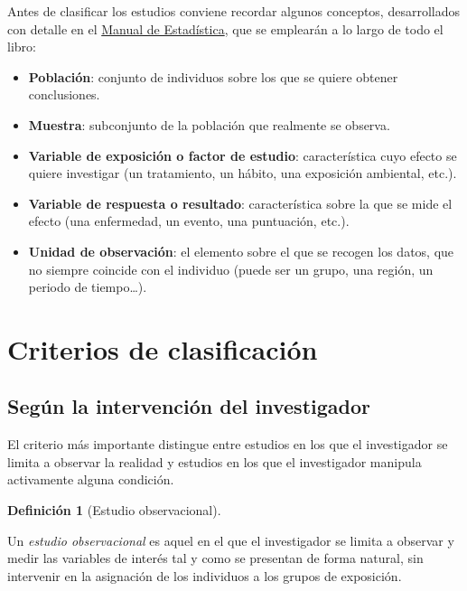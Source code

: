 \documentclass[
  spanish,
  a4paper,
]{scrreport}
\providecommand{\tightlist}{%
  \setlength{\itemsep}{0pt}\setlength{\parskip}{0pt}}
\theoremstyle{definition}
\theoremstyle{definition}
\newtheorem{definition}{Definición}[chapter]
\theoremstyle{remark}
\begin{document}
Antes de clasificar los estudios conviene recordar algunos conceptos,
desarrollados con detalle en el
\href{https://aprendeconalf.es/estadistica-manual/}{Manual de
Estadística}, que se emplearán a lo largo de todo el libro:

\begin{itemize}
\tightlist
\item
  \textbf{Población}: conjunto de individuos sobre los que se quiere
  obtener conclusiones.
\item
  \textbf{Muestra}: subconjunto de la población que realmente se
  observa.
\item
  \textbf{Variable de exposición o factor de estudio}: característica
  cuyo efecto se quiere investigar (un tratamiento, un hábito, una
  exposición ambiental, etc.).
\item
  \textbf{Variable de respuesta o resultado}: característica sobre la
  que se mide el efecto (una enfermedad, un evento, una puntuación,
  etc.).
\item
  \textbf{Unidad de observación}: el elemento sobre el que se recogen
  los datos, que no siempre coincide con el individuo (puede ser un
  grupo, una región, un periodo de tiempo\ldots).
\end{itemize}

\section{Criterios de
clasificación}\label{criterios-de-clasificaciuxf3n}

\subsection{Según la intervención del
investigador}\label{seguxfan-la-intervenciuxf3n-del-investigador}

El criterio más importante distingue entre estudios en los que el
investigador se limita a observar la realidad y estudios en los que el
investigador manipula activamente alguna condición.

\begin{definition}[Estudio
observacional]\protect\hypertarget{def-estudio-observacional}{}\label{def-estudio-observacional}

Un \emph{estudio observacional} es aquel en el que el investigador se
limita a observar y medir las variables de interés tal y como se
presentan de forma natural, sin intervenir en la asignación de los
individuos a los grupos de exposición.

\end{definition}
\end{document}
